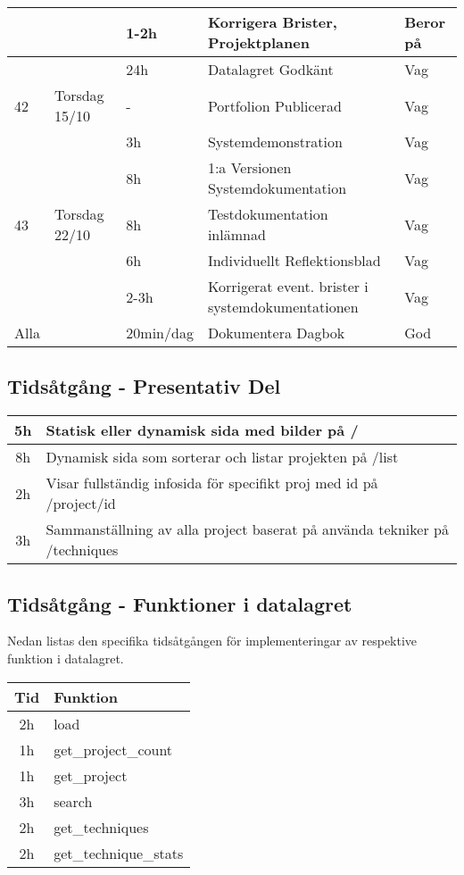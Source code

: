 \documentclass{TDP003mall}
\begin{document}
\begin{tabularx}{\linewidth}{|l|l|l|X|l|}
	\hline
          &                & 1-2h           & Korrigera Brister, Projektplanen                    & Beror på    \\
	\hline
          &                & 24h            & Datalagret Godkänt                                  & Vag         \\
	\hline
	42    & Torsdag 15/10  & -              & Portfolion Publicerad                               & Vag         \\
	\hline
          &                & 3h             & Systemdemonstration                                 & Vag         \\
	\hline
          &                & 8h             & 1:a Versionen Systemdokumentation                   & Vag         \\
	\hline
	43    & Torsdag 22/10  & 8h             & Testdokumentation inlämnad                          & Vag         \\
	\hline
          &                & 6h             & Individuellt Reflektionsblad                        & Vag         \\
	\hline
          &                & 2-3h           & Korrigerat event. brister i systemdokumentationen   & Vag         \\
	\hline
	\hline
	Alla  &                & 20min/dag      & Dokumentera Dagbok                                  & God         \\
	\hline
\end{tabularx}

\subsection{Tidsåtgång - Presentativ Del}
\begin{tabularx}{\linewidth}{|c|X|}
	\hline
	5h & Statisk eller dynamisk sida med bilder på /\\
	\hline
	8h & Dynamisk sida som sorterar och listar projekten på /list\\
	\hline
	2h & Visar fullständig infosida för specifikt proj med id på /project/id\\
	\hline
	3h & Sammanställning av alla project baserat på använda tekniker på /techniques\\
	\hline
\end{tabularx}

\subsection{Tidsåtgång - Funktioner i datalagret}
Nedan listas den specifika tidsåtgången för implementeringar av respektive funktion i datalagret.

\begin{tabularx}{\linewidth}{|c|X|}
	\hline
	Tid & Funktion\\
	\hline
	2h & load\\
	\hline
	1h & get\_project\_count\\
	\hline
	1h & get\_project\\
	\hline
	3h & search\\
	\hline
	2h & get\_techniques\\
	\hline
	2h & get\_technique\_stats\\
	\hline
\end{tabularx}
\end{document}
